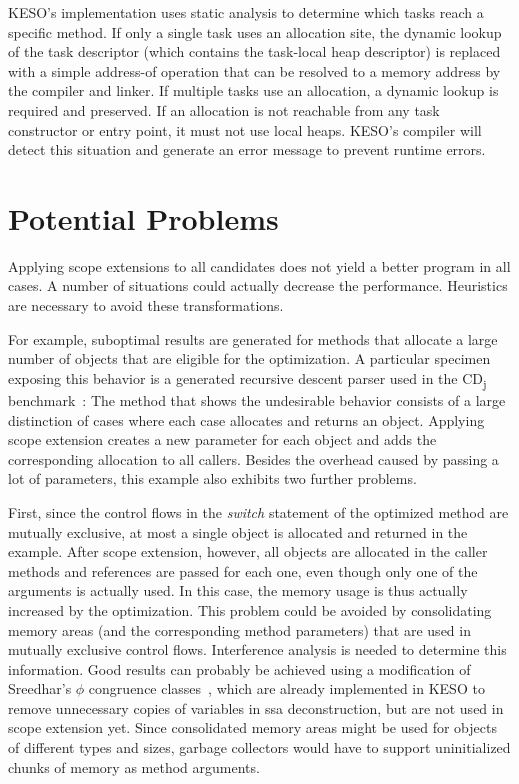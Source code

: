 			KESO's implementation uses static analysis to determine which tasks reach a specific method. If only a single task
			uses an allocation site, the dynamic lookup of the task descriptor (which contains the task-local heap descriptor)
			is replaced with a simple address-of operation that can be resolved to a memory address by the compiler and
			linker. If multiple tasks use an allocation, a dynamic lookup is required and preserved. If an allocation is not
			reachable from any task constructor or entry point, it must not use local heaps. KESO's compiler will detect this
			situation and generate an error message to prevent runtime errors.

	\section{Potential Problems}
		\label{sec:eea:probs}
		Applying scope extensions to all candidates does not yield a better program in all cases. A number of situations
		could actually decrease the performance. Heuristics are necessary to avoid these transformations.

		For example, suboptimal results are generated for methods that allocate a large number of objects that are eligible
		for the optimization. A particular specimen exposing this behavior is a generated recursive descent parser used in
		the CD\textsubscript{j} benchmark~\cite{kalibera:09:jtres}: The method that shows the undesirable behavior consists
		of a large distinction of cases where each case allocates and returns an object. Applying scope extension creates
		a new parameter for each object and adds the corresponding allocation to all callers. Besides the overhead caused by
		passing a lot of parameters, this example also exhibits two further problems.

		First, since the control flows in the \emph{switch} statement of the optimized method are mutually exclusive, at
		most a single object is allocated and returned in the example. After scope extension, however, all objects are
		allocated in the caller methods and references are passed for each one, even though only one of the arguments is
		actually used. In this case, the memory usage is thus actually increased by the optimization. This problem could be
		avoided by consolidating memory areas (and the corresponding method parameters) that are used in mutually exclusive
		control flows. Interference analysis is needed to determine this information. Good results can probably be achieved
		using a modification of Sreedhar's $\phi$ congruence classes~\cite{sreedhar:99:sas}, which are already implemented
		in KESO to remove unnecessary copies of variables in \gls{ssa} deconstruction, but are not used in scope extension
		yet. Since consolidated memory areas might be used for objects of different types and sizes, garbage collectors
		would have to support uninitialized chunks of memory as method arguments.

